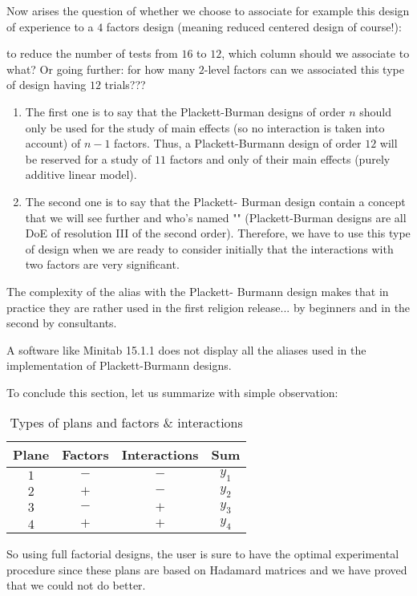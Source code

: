 	Now arises the question of whether we choose to associate for example this design of experience to a $4$ factors design (meaning reduced centered design of course!):
	
	to reduce the number of tests from $16$ to $12$, which column should we associate to what? Or going further: for how many $2$-level factors can we associated this type of design having $12$ trials???
	\begin{enumerate}
		\item The first one is to say that the Plackett-Burman designs of order $n$ should only be used for the study of main effects (so no interaction is taken into account) of $n-1$ factors. Thus, a Plackett-Burmann design of order $12$ will be reserved for a study of $11$ factors and only of their main effects (purely additive linear model).

		\item The second one is to say that the Plackett- Burman design contain a concept that we will see further and who's named "" (Plackett-Burman designs are all DoE of resolution III of the second order). Therefore, we have to use this type of design when we are ready to consider initially that the interactions with two factors are very significant.
	\end{enumerate}
	The complexity of the alias with the Plackett- Burmann design makes that in practice they are rather used in the first religion release... by beginners and in the second by consultants.
	\begin{tcolorbox}[title=Remark,colframe=black,arc=10pt]
	A software like Minitab 15.1.1 does not display all the aliases used in the implementation of Plackett-Burmann designs.
	\end{tcolorbox}
	To conclude this section, let us summarize with simple observation:
	\begin{table}[H]\centering
	\begin{center}
			\begin{tabular}{|c|c|c|c|}
				\hline
				\multicolumn{1}{c}{\cellcolor{black!30}\textbf{Plane}} & 
  \multicolumn{1}{c}{\cellcolor{black!30}\textbf{Factors}} & 
  \multicolumn{1}{c}{\cellcolor{black!30}\textbf{Interactions}} & 
  \multicolumn{1}{c}{\cellcolor{black!30}\textbf{Sum}} \\ \hline
				 $1$ &  $-$ & $-$ &  $y_1$\\ \hline
				 $2$ &  $+$ & $-$ &  $y_2$\\ \hline
				 $3$ &  $-$ & $+$ &  $y_3$\\ \hline
				 $4$ &  $+$ & $+$ &  $y_4$\\ \hline
		\end{tabular}
	\end{center}
	\caption{Types of plans and factors \& interactions}
	\end{table}
	So using full factorial designs, the user is sure to have the optimal experimental procedure since these plans are based on Hadamard matrices and we have proved that we could not do better.
	
